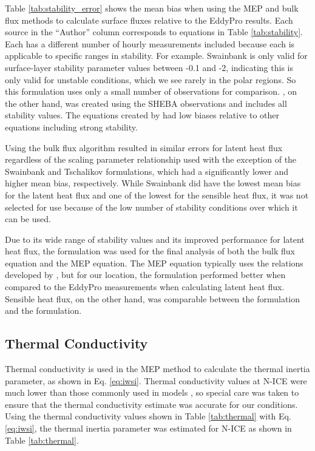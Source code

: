 Table \ref{tab:stability_error} shows the mean bias when using the MEP and bulk flux methods to calculate surface fluxes relative to the EddyPro results. Each source in the ``Author'' column corresponds to equations in Table \ref{tab:stability}. Each has a different number of hourly measurements included because each is applicable to specific ranges in stability. For example. Swainbank \citep{foken:2008} is only valid for surface-layer stability parameter values between -0.1 and -2, indicating this is only valid for unstable conditions, which we see rarely in the polar regions. So this formulation uses only a small number of observations for comparison. \citet{andreas:311}, on the other hand, was created using the SHEBA observations and includes all stability values. The equations created by \citet{andreas:311} had low biases relative to other equations including strong stability.

Using the bulk flux algorithm resulted in similar errors for latent heat flux regardless of the scaling parameter relationship used with the exception of the Swainbank and Tschalikov \citep{foken:2008} formulations, which had a significantly lower and higher mean bias, respectively. While Swainbank \citep{foken:2008} did have the lowest mean bias for the latent heat flux and one of the lowest for the sensible heat flux, it was not selected for use because of the low number of stability conditions over which it can be used.  

Due to its wide range of stability values and its improved performance for latent heat flux, the \citet{andreas:2010} formulation was used for the final analysis of both the bulk flux equation and the MEP equation. The MEP equation typically uses the relations developed by \citet{businger:1971}, but for our location, the \citet{andreas:311} formulation performed better when compared to the EddyPro measurements when calculating latent heat flux. Sensible heat flux, on the other hand, was comparable between the \citet{andreas:311} formulation and the \citet{businger:1971} formulation. 

\subsection{Thermal Conductivity}
Thermal conductivity is used in the MEP method to calculate the thermal inertia parameter, as shown in Eq. \ref{eq:iwsi}. Thermal conductivity values at N-ICE were much lower than those commonly used in models \citep{merkouriadi:2017}, so special care was taken to ensure that the thermal conductivity estimate was accurate for our conditions. Using the thermal conductivity values shown in Table \ref{tab:thermal} with Eq. \ref{eq:iwsi}, the thermal inertia parameter was estimated for N-ICE as shown in Table \ref{tab:thermal}. 

